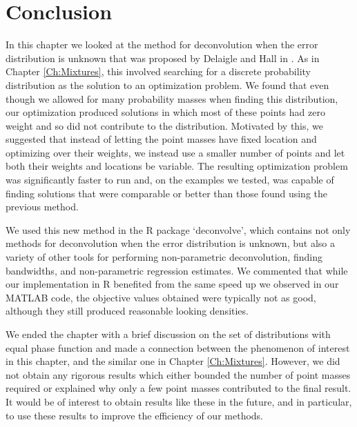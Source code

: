 
	


\section{Conclusion}

In this chapter we looked at the method for deconvolution when the error distribution is unknown that was proposed by Delaigle and Hall in \cite{Delaigle2016-la}. As in Chapter \ref{Ch:Mixtures}, this involved searching for a discrete probability distribution as the solution to an optimization problem. We found that even though we allowed for many probability masses when finding this distribution, our optimization produced solutions in which most of these points had zero weight and so did not contribute to the distribution. Motivated by this, we suggested that instead of letting the point masses have fixed location and optimizing over their weights, we instead use a smaller number of points and let both their weights and locations be variable. The resulting optimization problem was significantly faster to run and, on the examples we tested, was capable of finding solutions that were comparable or better than those found using the previous method.

We used this new method in the R package `deconvolve', which contains not only methods for deconvolution when the error distribution is unknown, but also a variety of other tools for performing non-parametric deconvolution, finding bandwidths, and non-parametric regression estimates. We commented that while our implementation in R benefited from the same speed up we observed in our MATLAB code, the objective values obtained were typically not as good, although they still produced reasonable looking densities.

We ended the chapter with a brief discussion on the set of distributions with equal phase function and made a connection between the phenomenon of interest in this chapter, and the similar one in Chapter \ref{Ch:Mixtures}. However, we did not obtain any rigorous results which either bounded the number of point masses required or explained why only a few point masses contributed to the final result. It would be of interest to obtain results like these in the future, and in particular, to use these results to improve the efficiency of our methods.